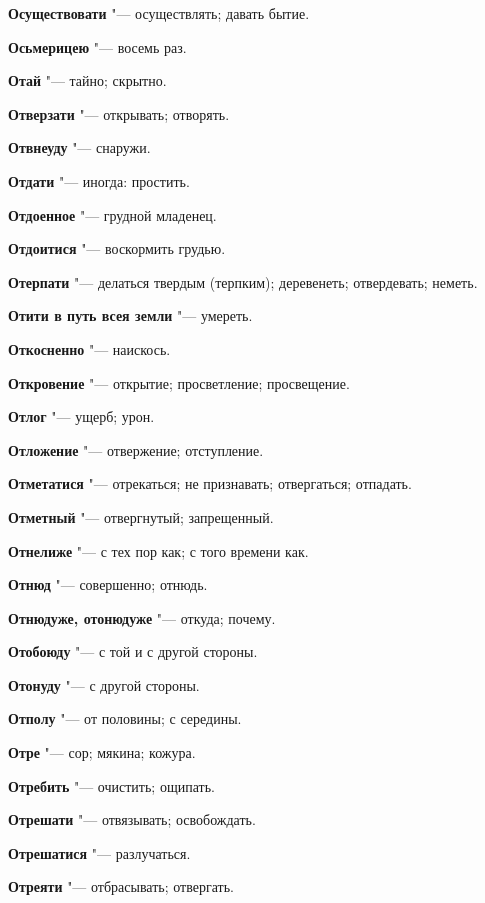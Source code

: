 \begin{mymulticols}
\noindent\textbf{Осуществовати} "--- осуществлять; давать бытие. 

\noindent\textbf{Осьмерицею} "--- восемь раз. 

\noindent\textbf{Отай} "--- тайно; скрытно. 

\noindent\textbf{Отверзати} "--- открывать; отворять. 

\noindent\textbf{Отвнеуду} "--- снаружи. 

\noindent\textbf{Отдати} "--- иногда: простить. 

\noindent\textbf{Отдоенное} "--- грудной младенец. 

\noindent\textbf{Отдоитися} "--- воскормить грудью. 

\noindent\textbf{Отерпати} "--- делаться твердым (терпким); деревенеть; отвердевать; неметь. 

\noindent\textbf{Отити в путь всея земли} "--- умереть. 

\noindent\textbf{Откосненно} "--- наискось. 

\noindent\textbf{Откровение} "--- открытие; просветление; просвещение. 

\noindent\textbf{Отлог} "--- ущерб; урон. 

\noindent\textbf{Отложение} "--- отвержение; отступление. 

\noindent\textbf{Отметатися} "--- отрекаться; не признавать; отвергаться; отпадать. 

\noindent\textbf{Отметный} "--- отвергнутый; запрещенный. 

\noindent\textbf{Отнелиже} "--- с тех пор как; с того времени как. 

\noindent\textbf{Отнюд} "--- совершенно; отнюдь. 

\noindent\textbf{Отнюдуже, отонюдуже} "--- откуда; почему. 

\noindent\textbf{Отобоюду} "--- с той и с другой стороны. 

\noindent\textbf{Отонуду} "--- с другой стороны. 

\noindent\textbf{Отполу} "--- от половины; с середины. 

\noindent\textbf{Отре} "--- сор; мякина; кожура. 

\noindent\textbf{Отребить} "--- очистить; ощипать. 

\noindent\textbf{Отрешати} "--- отвязывать; освобождать. 

\noindent\textbf{Отрешатися} "--- разлучаться. 

\noindent\textbf{Отреяти} "--- отбрасывать; отвергать. 


\end{mymulticols}
